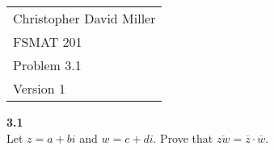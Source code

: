 \documentclass[12pt]{article}
\begin{document}
\begin{flushright}
\begin{tabular}{l}
Christopher David Miller \\  %
FSMAT 201 \\  %
Problem 3.1 \\  %
Version 1 \\ %
\end{tabular}
\end{flushright}
\vspace{20pt}  %


\textbf{3.1} \\  %
Let $z = a + bi$ and $w = c + di $. Prove that $\overline{zw} = \overline{z} \cdot \overline{w}$.
\end{document}
